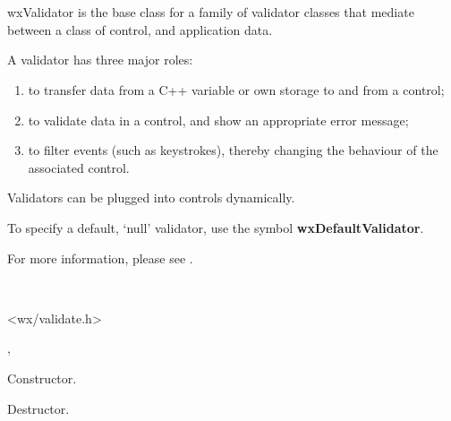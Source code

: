 \section{}\label{wxvalidator}

wxValidator is the base class for a family of validator classes that mediate
between a class of control, and application data.

A validator has three major roles:

\begin{enumerate}\itemsep=0pt
\item to transfer data from a C++ variable or own storage to and from a control;
\item to validate data in a control, and show an appropriate error message;
\item to filter events (such as keystrokes), thereby changing the behaviour of the
associated control.
\end{enumerate}

Validators can be plugged into controls dynamically.

To specify a default, `null' validator, use the symbol {\bf wxDefaultValidator}.

For more information, please see .


\\


<wx/validate.h>


, 


\label{wxvalidatorconstr}


Constructor.



Destructor.

\label{wxvalidatorclone}


